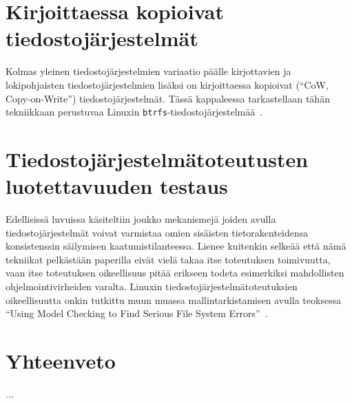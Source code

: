 \section{Kirjoittaessa kopioivat tiedostojärjestelmät}
\label{ChapCopyOnWrite}
Kolmas yleinen tiedostojärjestelmien variaatio päälle kirjottavien ja lokipohjaisten tiedostojärjestelmien lisäksi on kirjoittaessa kopioivat (``CoW, Copy-on-Write'') tiedostojärjestelmät.
Tässä kappaleessa tarkastellaan tähän tekniikkaan perustuvaa Linuxin \texttt{btrfs}-tiedostojärjestelmää~\cite{Btrfs}.

\section{Tiedostojärjestelmätoteutusten luotettavuuden testaus}

Edellisissä luvuissa käsiteltiin joukko mekanismejä joiden avulla tiedostojärjestelmät voivat varmistaa omien sisäisten tietorakenteidensa konsistenssin säilymisen kaatumistilanteessa.
Lienee kuitenkin selkeää että nämä tekniikat pelkästään paperilla eivät vielä takaa itse toteutuksen toimivuutta,
vaan itse toteutuksen oikeellisuus pitää erikseen todeta esimerkiksi mahdollisten ohjelmointivirheiden varalta.
Linuxin tiedostojärjestelmätoteutuksien oikeellisuutta onkin tutkittu muun muassa mallintarkistamisen avulla teoksessa ``Using Model Checking to Find Serious File System Errors''~\cite{ModelChecking}.

\section{Yhteenveto}

...
